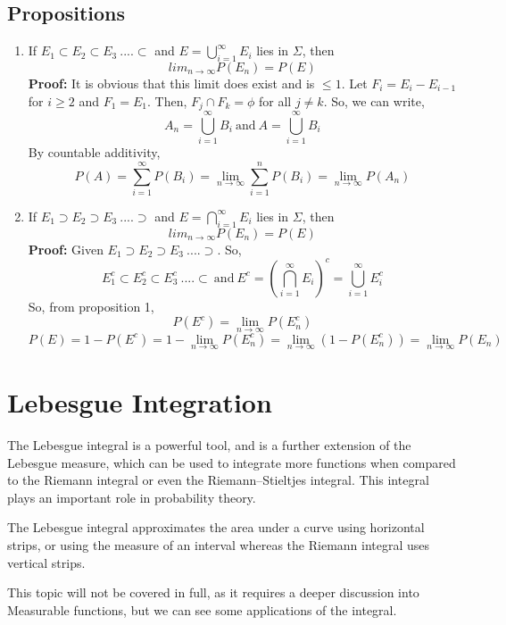 \documentclass{article}
\begin{document}
\subsection{Propositions}
\begin{enumerate}
	\item If $E_1 \subset E_2 \subset E_3 \ ....\subset$ and $E = \bigcup \limits_{i=1}^\infty E_i$ lies in $\Sigma$, then 
	$$lim_{n \rightarrow \infty}P(E_n) = P(E)$$
	\textbf{Proof: }It is obvious that this limit does exist and is $\leq 1$. Let $F_i = E_i - E_{i-1}$ for $i \geq 2$ and $F_1 = E_1$. Then, $F_j \cap F_k = \phi$ for all $j \neq k$. So, we can write,
	$$A_n = \bigcup \limits_{i=1}^\infty B_i \ \textrm{and}\  A = \bigcup \limits_{i=1}^\infty B_i$$
	By countable additivity,
	$$P(A) = \sum \limits_{i=1}^\infty P(B_i) = \lim_{n \rightarrow \infty } \sum \limits_{i=1}^n P(B_i) = \lim_{n \rightarrow \infty}P(A_n) $$
	\item If $E_1 \supset E_2 \supset E_3 \ ....\supset$ and $E = \bigcap \limits_{i=1}^\infty E_i$ lies in $\Sigma$, then 
	$$lim_{n \rightarrow \infty}P(E_n) = P(E)$$
	\textbf{Proof: } Given $E_1 \supset E_2 \supset E_3 \ ....\supset$. So, $$E_1^c \subset E_2^c \subset E_3^c \ ....\subset \ \textrm{and}\  E^c =  (\bigcap \limits_{i=1}^\infty E_i)^c = \bigcup \limits_{i=1}^\infty E_i^c$$
	So, from proposition 1,
	$$P(E^c) = \lim_{n \rightarrow \infty}P(E_n^c)$$
	$$P(E) = 1 - P(E^c) = 1 - \lim_{n \rightarrow \infty}P(E_n^c) = \lim_{n \rightarrow \infty}(1- P(E_n^c)) = \lim_{n \rightarrow \infty}P(E_n)$$

\end{enumerate}

\section{Lebesgue Integration}

The Lebesgue integral is a powerful tool, and is a further extension of the Lebesgue measure, which can be used to integrate more functions when compared to the Riemann integral or even the Riemann–Stieltjes integral. 
This integral plays an important role in probability theory.

The Lebesgue integral approximates the area under a curve using horizontal strips, or using the measure of an interval whereas the Riemann integral uses vertical strips.

This topic will not be covered in full, as it requires a deeper discussion into Measurable functions, but we can see some applications of the integral.
\end{document}
